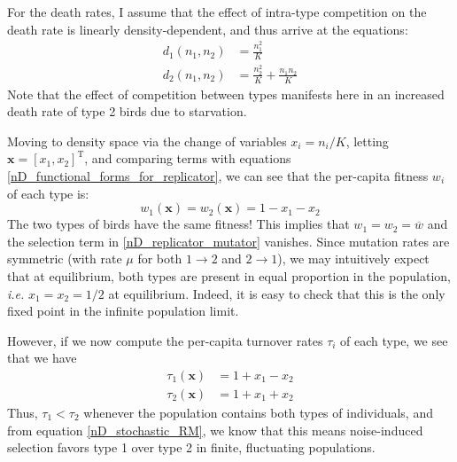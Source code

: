 For the death rates, I assume that the effect of intra-type competition on the death rate is linearly density-dependent, and thus arrive at the equations:
\begin{equation}
\label{App_example_stoch_LV_death_rates}
\begin{aligned}
	d_{1}({n_1},{n_2}) &= \frac{{n_1^2}}{K}\\
	d_{2}({n_1},{n_2}) &= \frac{{n_2^2}}{K} + \frac{{n_1}{n_2}}{K}
\end{aligned}
\end{equation}
Note that the effect of competition between types manifests here in an increased death rate of type 2 birds due to starvation.

Moving to density space via the change of variables $x_i = n_i/K$, letting $\mathbf{x} = [x_1, x_2]^{\mathrm{T}}$, and comparing terms with equations \eqref{nD_functional_forms_for_replicator}, we can see that the per-capita fitness $w_i$ of each type is:
\begin{equation*}
	w_{1}(\mathbf{x}) = w_{2}(\mathbf{x}) = 1 - x_1 - x_2
\end{equation*}
The two types of birds have the same fitness! This implies that $w_1 = w_2 = \overline{w}$ and the selection term in \eqref{nD_replicator_mutator} vanishes. Since mutation rates are symmetric (with rate $\mu$ for both $1 \to 2$ and $2 \to 1$), we may intuitively expect that at equilibrium, both types are present in equal proportion in the population, \emph{i.e.} $x_1 = x_2 = 1/2$ at equilibrium. Indeed, it is easy to check that this is the only fixed point in the infinite population limit.

However, if we now compute the per-capita turnover rates $\tau_i$  of each type, we see that we have
\begin{align*}
	\tau_{1}(\mathbf{x}) &= 1 + x_1 - x_2\\
	\tau_{2}(\mathbf{x}) &= 1 + x_1 + x_2
\end{align*}
Thus, $\tau_{1} < \tau_{2}$ whenever the population contains both types of individuals, and from equation \eqref{nD_stochastic_RM}, we know that this means noise-induced selection favors type 1 over type 2 in finite, fluctuating populations.

